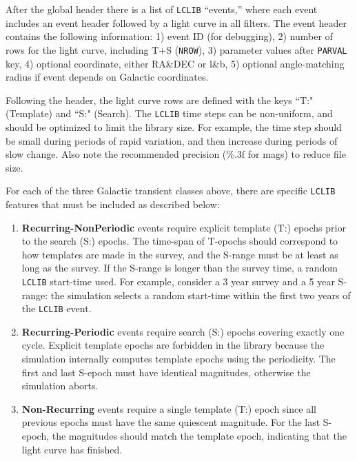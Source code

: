 \documentclass[12pt]{article}
\begin{document}
After the global header there is a list of  {\tt LCLIB} ``events,'' 
where each event includes an event header followed by  a 
light curve in all filters. 
The event header  contains the following information:
1) event ID (for debugging), 
2) number of rows for the light curve, including T+S ({\tt NROW}),
3) parameter values after {\tt PARVAL} key,
4) optional coordinate, either RA\&DEC or l\&b,
5) optional angle-matching radius if event depends on Galactic coordinates.
 
Following the header, the light curve rows are defined with the keys
``T:" (Template) and ``S:" (Search). 
The {\tt LCLIB} time steps can be non-uniform, and should be optimized 
to limit the library size. For example, the time step should be small 
during periods of rapid variation, and then increase during periods 
of slow change. Also note  the recommended precision (\%.3f for mags) 
to reduce file size.

For each of the three Galactic transient classes above, 
there are specific {\tt LCLIB}
features that must be included as described below:

\begin{enumerate}
  \item {\bf Recurring-NonPeriodic} events require explicit template (T:) 
      epochs prior to the search (S:) epochs.  
      The time-span of T-epochs should correspond to how templates are
      made in the survey, and the S-range must be at least as long as 
      the survey. If the S-range is longer than the survey time, 
      a random {\tt LCLIB} start-time  used. For example, 
      consider a 3 year survey and a 5 year S-range:
      the simulation selects a random start-time within the first two 
      years of the  {\tt LCLIB} event.
%           
   \item  {\bf Recurring-Periodic} events require search (S:) epochs covering exactly one cycle.
             Explicit template epochs are forbidden in the library because the simulation 
             internally computes template epochs using the periodicity. 
             The first and last S-epoch must have identical magnitudes, otherwise the simulation
             aborts.
%
   \item {\bf Non-Recurring} events require a single template (T:) epoch since all previous
            epochs must have the same quiescent magnitude. For the last S-epoch,
            the magnitudes should match the template epoch, indicating that the light curve
            has finished.
\end{enumerate}
\end{document}
